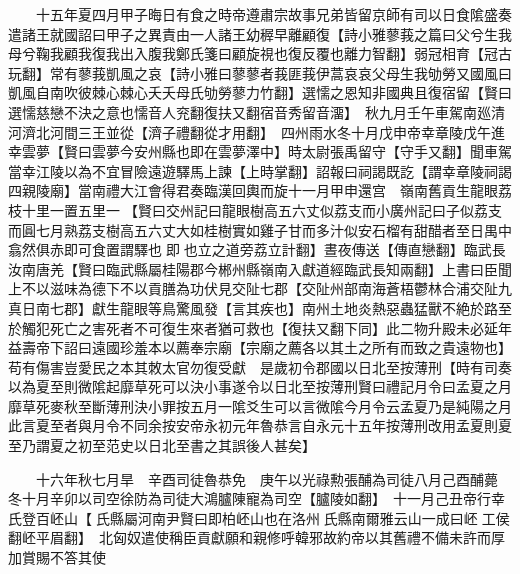 　　十五年夏四月甲子晦日有食之時帝遵肅宗故事兄弟皆留京師有司以日食隂盛奏遣諸王就國詔曰甲子之異責由一人諸王幼稺早離顧復【詩小雅蓼莪之篇曰父兮生我母兮鞠我顧我復我出入腹我鄭氏箋曰顧旋視也復反覆也離力智翻】弱冠相育【冠古玩翻】常有蓼莪凱風之哀【詩小雅曰蓼蓼者莪匪莪伊蒿哀哀父母生我劬勞又國風曰凱風自南吹彼棘心棘心夭夭母氏劬勞蓼力竹翻】選懦之恩知非國典且復宿留【賢曰選懦慈戀不決之意也懦音人兖翻復扶又翻宿音秀留音澑】　秋九月壬午車駕南廵清河濟北河間三王並從【濟子禮翻從才用翻】　四州雨水冬十月戊申帝幸章陵戊午進幸雲夢【賢曰雲夢今安州縣也即在雲夢澤中】時太尉張禹留守【守手又翻】聞車駕當幸江陵以為不宜冒險遠遊驛馬上諫【上時掌翻】詔報曰祠謁既訖【謂幸章陵祠謁四親陵廟】當南禮大江會得君奏臨漢回輿而旋十一月甲申還宫　嶺南舊貢生龍眼荔枝十里一置五里一【賢曰交州記曰龍眼樹高五六丈似荔支而小廣州記曰子似荔支而圓七月熟荔支樹高五六丈大如桂樹實如雞子甘而多汁似安石榴有甜醋者至日禺中翕然俱赤即可食置謂驛也即也立之道旁荔立計翻】晝夜傳送【傳直戀翻】臨武長汝南唐羌【賢曰臨武縣屬桂陽郡今郴州縣嶺南入獻道經臨武長知兩翻】上書曰臣聞上不以滋味為德下不以貢膳為功伏見交阯七郡【交阯州部南海蒼梧鬱林合浦交阯九真日南七郡】獻生龍眼等鳥驚風發【言其疾也】南州土地炎熱惡蟲猛獸不絶於路至於觸犯死亡之害死者不可復生來者猶可救也【復扶又翻下同】此二物升殿未必延年益壽帝下詔曰遠國珍羞本以薦奉宗廟【宗廟之薦各以其土之所有而致之貴遠物也】苟有傷害豈愛民之本其敇太官勿復受獻　是歲初令郡國以日北至按薄刑【時有司奏以為夏至則微隂起靡草死可以決小事遂令以日北至按薄刑賢曰禮記月令曰孟夏之月靡草死麥秋至斷薄刑決小罪按五月一隂爻生可以言微隂今月令云孟夏乃是純陽之月此言夏至者與月令不同余按安帝永初元年魯恭言自永元十五年按薄刑改用孟夏則夏至乃謂夏之初至范史以日北至書之其誤後人甚矣】

　　十六年秋七月旱　辛酉司徒魯恭免　庚午以光祿勲張酺為司徒八月己酉酺薨　冬十月辛卯以司空徐防為司徒大鴻臚陳寵為司空【臚陵如翻】　十一月己丑帝行幸氏登百岯山【氏縣屬河南尹賢曰即柏岯山也在洛州氏縣南爾雅云山一成曰岯工侯翻岯平眉翻】　北匈奴遣使稱臣貢獻願和親修呼韓邪故約帝以其舊禮不備未許而厚加賞賜不答其使

